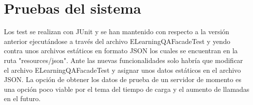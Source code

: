 \section{Pruebas del sistema}
Los test se realizan con JUnit y se han mantenido con respecto a la versión anterior ejecutándose a través del archivo ELearningQAFacadeTest y yendo contra unos archivos estáticos en formato JSON los cuales se encuentran en la ruta "resources/json". Ante las nuevas funcionalidades solo habría que modificar el archivo ELearningQAFacadeTest y asignar unos datos estáticos en el archivo JSON. La opción de obtener los datos de prueba de un servidor de momento es una opción poco viable por el tema del tiempo de carga y el aumento de llamadas en el futuro.